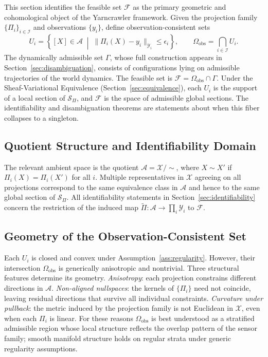 \documentclass[12pt, oneside]{article}
\newcommand{\Ftil}{\widetilde{\Pi}}
\begin{document}
This section identifies the feasible set $\mathcal{F}$ as the primary geometric and
cohomological object of the Yarncrawler framework. Given the projection family
$\{\Pi_i\}_{i \in \mathcal{I}}$ and observations $\{y_i\}$, define
observation-consistent sets
\[
U_i = \left\{ [X] \in \mathcal{A} \;\middle|\;
\|\Pi_i(X) - y_i\|_{\mathcal{Y}_i} \le \epsilon_i \right\},
\qquad
\Omega_{\mathrm{obs}} = \bigcap_{i \in \mathcal{I}} U_i.
\]
The dynamically admissible set $\Gamma$, whose full construction appears in
Section~\ref{sec:disambiguation}, consists of configurations lying on admissible
trajectories of the world dynamics. The feasible set is
$\mathcal{F} = \Omega_{\mathrm{obs}} \cap \Gamma$.
Under the Sheaf-Variational Equivalence (Section~\ref{sec:equivalence}), each $U_i$
is the support of a local section of $\mathcal{S}_\Pi$, and $\mathcal{F}$ is the space
of admissible global sections. The identifiability and disambiguation theorems are
statements about when this fiber collapses to a singleton.

\subsection{Quotient Structure and Identifiability Domain}

The relevant ambient space is the quotient $\mathcal{A} = \mathcal{X}/{\sim}$, where
$X \sim X'$ if $\Pi_i(X) = \Pi_i(X')$ for all $i$. Multiple representatives in
$\mathcal{X}$ agreeing on all projections correspond to the same equivalence class in
$\mathcal{A}$ and hence to the same global section of $\mathcal{S}_\Pi$. All
identifiability statements in Section~\ref{sec:identifiability} concern the restriction
of the induced map $\Ftil : \mathcal{A} \to \prod_i \mathcal{Y}_i$ to $\mathcal{F}$.

\subsection{Geometry of the Observation-Consistent Set}

Each $U_i$ is closed and convex under Assumption~\ref{ass:regularity}. However, their
intersection $\Omega_{\mathrm{obs}}$ is generically anisotropic and nontrivial. Three
structural features determine its geometry. \emph{Anisotropy}: each projection
constrains different directions in $\mathcal{A}$. \emph{Non-aligned nullspaces}: the
kernels of $\{\Pi_i\}$ need not coincide, leaving residual directions that survive all
individual constraints. \emph{Curvature under pullback}: the metric induced by the
projection family is not Euclidean in $\mathcal{X}$, even when each $\Pi_i$ is linear.
For these reasons $\Omega_{\mathrm{obs}}$ is best understood as a stratified admissible
region whose local structure reflects the overlap pattern of the sensor family; smooth
manifold structure holds on regular strata under generic regularity assumptions.
\end{document}
